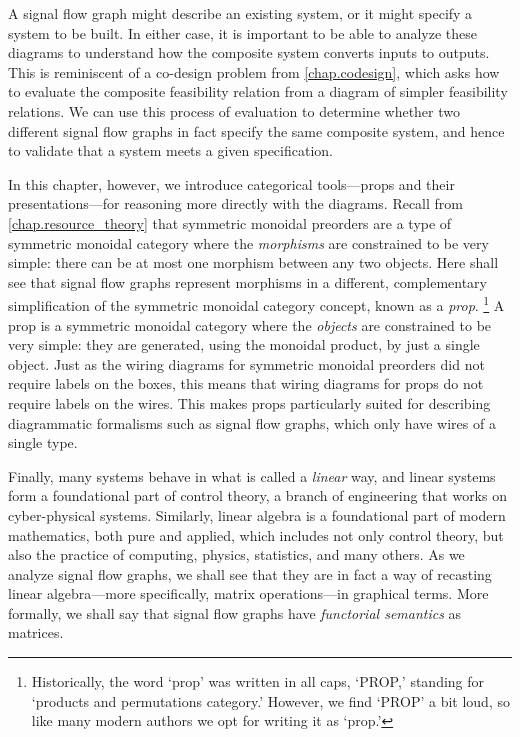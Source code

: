 \documentclass[7Sketches]{subfiles}
\begin{document}
A signal flow graph might describe an existing system, or it might specify a
system to be built. In either case, it is important to be able to analyze these
diagrams to understand how the composite system converts inputs to outputs.
This is reminiscent of a co-design problem from \cref{chap.codesign}, which asks
how to evaluate the composite feasibility relation from a diagram of simpler feasibility
relations. We can use this process of evaluation to determine whether two
different signal flow graphs in fact specify the same composite system, and
hence to validate that a system meets a given specification. 

In this chapter, however, we introduce categorical tools---props and
their presentations---for reasoning more directly with the diagrams. Recall from
\cref{chap.resource_theory} that symmetric monoidal preorders are a type of
symmetric monoidal category where the \emph{morphisms} are constrained to be
very simple: there can be at most one morphism between any two objects. Here
shall see that signal flow graphs represent morphisms in a different,
complementary simplification of the symmetric monoidal category concept, known as a \emph{prop}.%
\footnote{
Historically, the word `prop' was written in all caps, `PROP,' standing for `products and permutations category.' However, we find `PROP' a bit loud, so like many modern authors we opt for writing it as `prop.'
}
A prop is a symmetric monoidal category where the \emph{objects} are constrained
to be very simple: they are generated, using the monoidal product, by just a
single object. Just as the wiring diagrams for symmetric monoidal preorders did
not require labels on the boxes, this means that wiring diagrams for props do
not require labels on the wires. This makes props particularly suited for
describing diagrammatic formalisms such as signal flow graphs, which only have
wires of a single type.

Finally, many systems behave in what is called a \emph{linear} way, and linear systems form a foundational part of control theory, a branch of engineering that works on cyber-physical systems. Similarly, linear
algebra is a foundational part of modern mathematics, both pure and applied,
which includes not only control theory, but also the practice of computing,
physics, statistics, and many others. As we analyze signal flow graphs, we shall see that they are in fact a
way of recasting linear algebra---more specifically, matrix operations---in graphical terms. More formally, we shall say
that signal flow graphs have \emph{functorial semantics} as matrices. %
\end{document}
